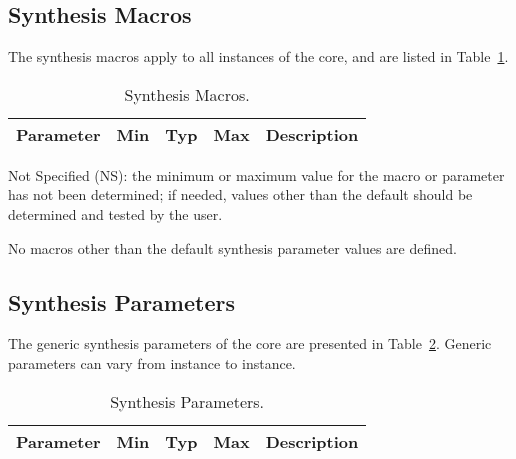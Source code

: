 \subsection{Synthesis Macros}

\ifdefined\SM

The synthesis macros apply to all instances of the core, and are listed in
Table~\ref{tab:sm}.

\begin{table}[h]
  \centering
    \begin{tabularx}{\textwidth}{ | c | c | c | c | X | }
    \hline
    \rowcolor{iob-green}
    {\bf Parameter} & {\bf Min} & {\bf Typ} & {\bf Max} & {\bf Description} \\\hline

    

    \end{tabularx}
  \caption{Synthesis Macros.}
  \label{tab:sm}
\end{table}

\begin{description}
\item{Not Specified (NS)}:  the minimum or maximum value for the macro or parameter has not been determined; if needed, values other than the default should be determined and tested by the user. 
\end{description}

\else
No macros other than the default synthesis parameter values are defined.
\fi


\subsection{Synthesis Parameters}

\ifdefined\SP

The generic synthesis parameters of the core are presented in
Table~\ref{tab:sp}. Generic parameters can vary from instance to instance.

\begin{table}[h]
  \centering
    \begin{tabularx}{\textwidth}{ | c | c | c | c | X | }
    \hline
    \rowcolor{iob-green}
    {\bf Parameter} & {\bf Min} & {\bf Typ} & {\bf Max} & {\bf Description} \\\hline

    

    \end{tabularx}
    
\caption{Synthesis Parameters.}
  \label{tab:sp}
\end{table}

